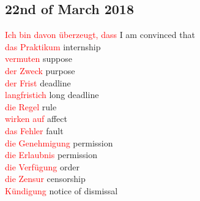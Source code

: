 \documentclass{article}
\begin{document}
\begin{multicols}{2}
	\section*{22nd of March 2018}
	\textcolor{red}{Ich bin davon überzeugt, dass} I am convinced that\\
	\textcolor{red}{das Praktikum} internship\\
	\textcolor{red}{vermuten} suppose\\
	\textcolor{red}{der Zweck} purpose\\
	\textcolor{red}{der Frist} deadline\\
	\textcolor{red}{langfristich} long deadline\\
	\textcolor{red}{die Regel} rule\\
	\textcolor{red}{wirken auf} affect\\
	\textcolor{red}{das Fehler} fault\\
	\textcolor{red}{die Genehmigung} permission\\
	\textcolor{red}{die Erlaubnis} permission\\
	\textcolor{red}{die Verfügung} order\\
	\textcolor{red}{die Zensur} censorship\\
	\textcolor{red}{Kündigung} notice of dismissal\\\\
	

\end{multicols}
\end{document}
